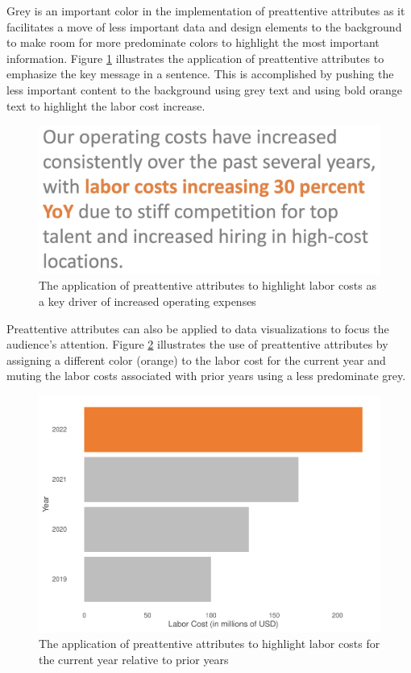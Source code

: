 \documentclass[
]{book}
\begin{document}
Grey is an important color in the implementation of preattentive attributes as it facilitates a move of less important data and design elements to the background to make room for more predominate colors to highlight the most important information. Figure \ref{fig:pre-attr-1} illustrates the application of preattentive attributes to emphasize the key message in a sentence. This is accomplished by pushing the less important content to the background using grey text and using bold orange text to highlight the labor cost increase.

\begin{figure}

{\centering \includegraphics[width=0.75\linewidth]{graphics/preattentive_attributes} 

}

\caption{The application of preattentive attributes to highlight labor costs as a key driver of increased operating expenses}\label{fig:pre-attr-1}
\end{figure}

Preattentive attributes can also be applied to data visualizations to focus the audience's attention. Figure \ref{fig:pre-attr-2} illustrates the use of preattentive attributes by assigning a different color (orange) to the labor cost for the current year and muting the labor costs associated with prior years using a less predominate grey.

\begin{figure}

{\centering \includegraphics[width=1\linewidth]{The_Fundamentals_of_People_Analytics_files/figure-latex/pre-attr-2-1} 

}

\caption{The application of preattentive attributes to highlight labor costs for the current year relative to prior years}\label{fig:pre-attr-2}
\end{figure}
\end{document}

